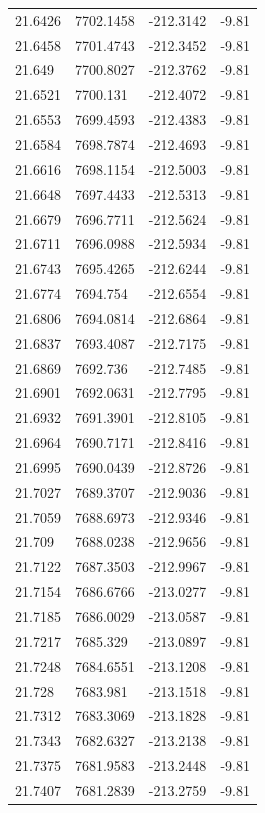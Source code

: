 \begin{table}[H]
\begin{tabular}{llll}
21.6426 & 7702.1458 & -212.3142 & -9.81 \\
21.6458 & 7701.4743 & -212.3452 & -9.81 \\
21.649 & 7700.8027 & -212.3762 & -9.81 \\
21.6521 & 7700.131 & -212.4072 & -9.81 \\
21.6553 & 7699.4593 & -212.4383 & -9.81 \\
21.6584 & 7698.7874 & -212.4693 & -9.81 \\
21.6616 & 7698.1154 & -212.5003 & -9.81 \\
21.6648 & 7697.4433 & -212.5313 & -9.81 \\
21.6679 & 7696.7711 & -212.5624 & -9.81 \\
21.6711 & 7696.0988 & -212.5934 & -9.81 \\
21.6743 & 7695.4265 & -212.6244 & -9.81 \\
21.6774 & 7694.754 & -212.6554 & -9.81 \\
21.6806 & 7694.0814 & -212.6864 & -9.81 \\
21.6837 & 7693.4087 & -212.7175 & -9.81 \\
21.6869 & 7692.736 & -212.7485 & -9.81 \\
21.6901 & 7692.0631 & -212.7795 & -9.81 \\
21.6932 & 7691.3901 & -212.8105 & -9.81 \\
21.6964 & 7690.7171 & -212.8416 & -9.81 \\
21.6995 & 7690.0439 & -212.8726 & -9.81 \\
21.7027 & 7689.3707 & -212.9036 & -9.81 \\
21.7059 & 7688.6973 & -212.9346 & -9.81 \\
21.709 & 7688.0238 & -212.9656 & -9.81 \\
21.7122 & 7687.3503 & -212.9967 & -9.81 \\
21.7154 & 7686.6766 & -213.0277 & -9.81 \\
21.7185 & 7686.0029 & -213.0587 & -9.81 \\
21.7217 & 7685.329 & -213.0897 & -9.81 \\
21.7248 & 7684.6551 & -213.1208 & -9.81 \\
21.728 & 7683.981 & -213.1518 & -9.81 \\
21.7312 & 7683.3069 & -213.1828 & -9.81 \\
21.7343 & 7682.6327 & -213.2138 & -9.81 \\
21.7375 & 7681.9583 & -213.2448 & -9.81 \\
21.7407 & 7681.2839 & -213.2759 & -9.81 \\

\end{tabular}
\end{table}

